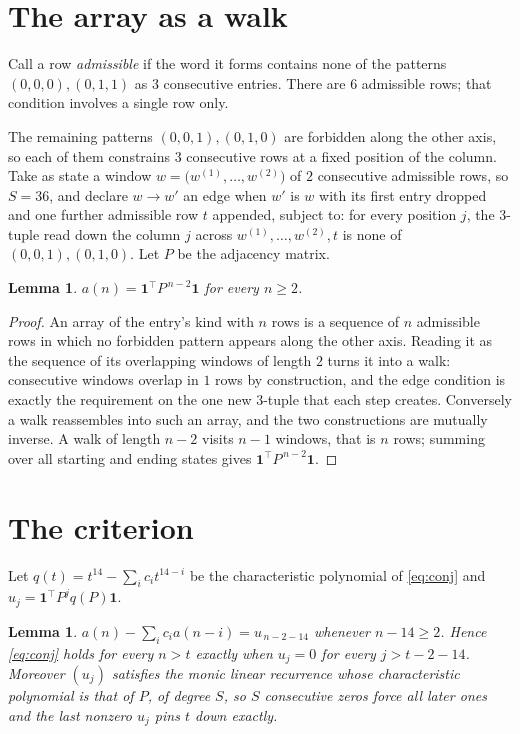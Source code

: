 \documentclass[11pt,a4paper]{article}
\theoremstyle{plain}
\newtheorem{lemma}[theorem]{Lemma}
\theoremstyle{definition}
\begin{document}
\section{The array as a walk}

Call a row \emph{admissible} if the word it forms contains none of the patterns
$(0,0,0), (0,1,1)$ as $3$ consecutive entries. There are $6$ admissible rows; that condition
involves a single row only.

The remaining patterns $(0,0,1), (0,1,0)$ are forbidden along the other axis, so each of them
constrains $3$ consecutive rows at a fixed position of the column. Take as state a
window $w=\bigl(w^{(1)},\dots,w^{(2)}\bigr)$ of $2$ consecutive admissible
rows, so $S=36$, and declare $w\to w'$ an edge when $w'$ is $w$ with its first entry
dropped and one further admissible row $t$ appended, subject to: for every position
$j$, the $3$-tuple read down the column $j$ across $w^{(1)},\dots,w^{(2)},t$
is none of $(0,0,1), (0,1,0)$. Let $P$ be the adjacency matrix.

\begin{lemma}\label{lem:walk}
$a(n)=\mathbf{1}^{\!\top}P^{\,n-2}\mathbf{1}$ for every $n\ge2$.
\end{lemma}

\begin{proof}
An array of the entry's kind with $n$ rows is a sequence of $n$ admissible rows in
which no forbidden pattern appears along the other axis. Reading it as the sequence of its
overlapping windows of length $2$ turns it into a walk: consecutive windows overlap in
$1$ rows by construction, and the edge condition is exactly the requirement on the one
new $3$-tuple that each step creates. Conversely a walk reassembles into such an array,
and the two constructions are mutually inverse. A walk of length $n-2$ visits $n-1$
windows, that is $n$ rows; summing over all starting and ending states gives
$\mathbf{1}^{\!\top}P^{\,n-2}\mathbf{1}$.
\end{proof}

\section{The criterion}

Let $q(t)=t^{14}-\sum_i c_i t^{14-i}$ be the characteristic polynomial of
\eqref{eq:conj} and $u_j=\mathbf{1}^{\!\top}P^{j}q(P)\mathbf{1}$.

\begin{lemma}\label{lem:crit}
$a(n)-\sum_i c_i a(n-i)=u_{\,n-2-14}$ whenever $n-14\ge2$. Hence
\eqref{eq:conj} holds for every $n>t$ exactly when $u_j=0$ for every
$j>t-2-14$. Moreover $(u_j)$ satisfies the monic linear recurrence whose
characteristic polynomial is that of $P$, of degree $S$, so $S$ consecutive zeros force all
later ones and the last nonzero $u_j$ pins $t$ down exactly.
\end{lemma}
\end{document}
